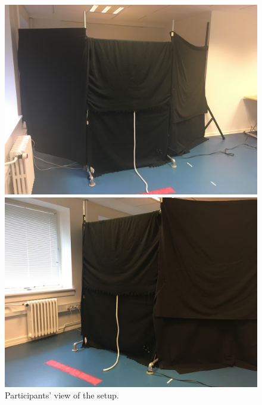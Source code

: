 \begin{figure}
  \centering
  \captionsetup{justification=centering,margin=0.1cm}
\hspace*{\fill}
  \begin{minipage}[b]{0.4\textwidth}
    \includegraphics[width=\textwidth]{Images/setup1.JPG}
  \end{minipage}
  \hfill
  \begin{minipage}[b]{0.4\textwidth}
    \includegraphics[width=\textwidth]{Images/setup2.JPG}
  \end{minipage}
\hspace*{\fill}
     \caption{Participants' view of the setup.}
     \label{fig:setupBlack}
\end{figure}
